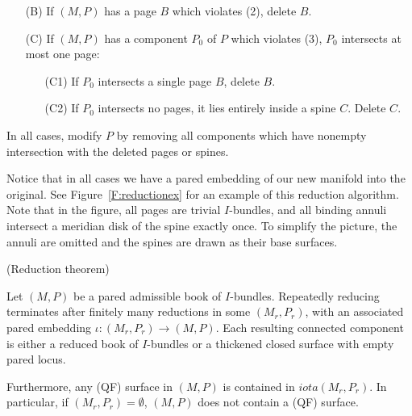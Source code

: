 \begin{defn}
\begin{enumerate}
\item[(B)] If $(M,P)$ has a page $B$ which violates (2), delete $B$.

\item[(C)] If $(M,P)$ has a component $P_0$ of $P$ which violates (3), $P_0$
intersects at most one page:

\begin{enumerate}

\item[(C1)] If $P_0$ intersects a single page $B$, delete $B$.

\item[(C2)] If $P_0$ intersects no pages, it lies entirely inside a spine $C$.
Delete $C$.

\end{enumerate}

\end{enumerate}

In all cases, modify $P$ by removing all components which have nonempty
intersection with the deleted pages or spines.

\end{defn}

Notice that in all cases we have a pared embedding of our new manifold into the
original. See Figure~\ref{F:reductionex} for an example of this reduction
algorithm. Note that in the figure, all pages are trivial $I$-bundles, and all
binding annuli intersect a meridian disk of the spine exactly once. To simplify
the picture, the annuli are omitted and the spines are drawn as their base
surfaces.


\begin{thm}(Reduction theorem)

Let $(M,P)$ be a pared admissible book of $I$-bundles. Repeatedly reducing
terminates after finitely many reductions in some $(M_r,P_r)$, with an
associated pared embedding $\iota\colon (M_r,P_r) \to (M,P)$. Each resulting
connected component is either a reduced book of $I$-bundles or a thickened
closed surface with empty pared locus.

Furthermore, any (QF) surface in $(M,P)$ is contained in $iota(M_r,P_r)$. In
particular, if $(M_r,P_r)=\emptyset$, $(M,P)$ does not contain a (QF) surface.

\end{thm}


